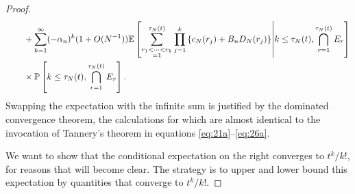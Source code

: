 \documentclass{article}
\newcommand{\Prob}{\mathbb{P}}
\newcommand{\E}{\mathbb{E}}
\newcommand{\1}[1]{\mathbbm{1}_{#1}}
\begin{document}
\begin{proof}
\begin{align}
&\qquad + \sum_{k=1}^{\infty} (- \alpha_n)^k (1+O(N^{-1}))
\E \left[ \sum_{\substack{r_1<\dots<r_k \\ =1}}^{\tau_N(t)}\prod_{j=1}^k 
\left\{ c_N(r_j) + B_n D_N(r_j) \right\} \middle| k\leq\tau_N(t), \bigcap_{r=1}^{\tau_N(t)} E_r \right] \notag\\
&\qquad \times \Prob \left[ k\leq \tau_N(t), \bigcap_{r=1}^{\tau_N(t)} E_r \right] .
\end{align}
Swapping the expectation with the infinite sum is justified by the dominated convergence theorem, the calculations for which are almost identical to the invocation of Tannery's theorem in equations 
\eqref{eq:21a}--\eqref{eq:26a}.

We want to show that the conditional expectation on the right converges to $t^k/k!$, for reasons that will become clear. The strategy is to upper and lower bound this expectation by quantities that converge to $t^k/k!$. 


\end{proof}
\end{document}
